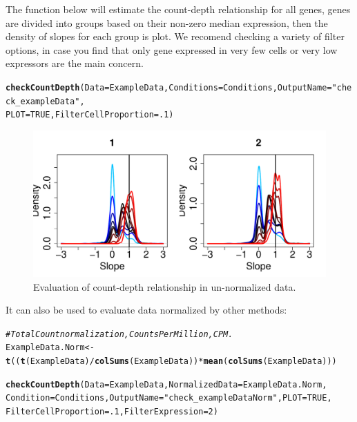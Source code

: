 \documentclass{article}\usepackage[]{graphicx}\usepackage[usenames,dvipsnames]{color}
\makeatletter
\newcommand{\hlnum}[1]{\textcolor[rgb]{0.686,0.059,0.569}{#1}}%
\newcommand{\hlstr}[1]{\textcolor[rgb]{0.192,0.494,0.8}{#1}}%
\newcommand{\hlcom}[1]{\textcolor[rgb]{0.678,0.584,0.686}{\textit{#1}}}%
\newcommand{\hlopt}[1]{\textcolor[rgb]{0,0,0}{#1}}%
\newcommand{\hlstd}[1]{\textcolor[rgb]{0.345,0.345,0.345}{#1}}%
\newcommand{\hlkwb}[1]{\textcolor[rgb]{0.69,0.353,0.396}{#1}}%
\newcommand{\hlkwc}[1]{\textcolor[rgb]{0.333,0.667,0.333}{#1}}%
\newcommand{\hlkwd}[1]{\textcolor[rgb]{0.737,0.353,0.396}{\textbf{#1}}}%
\newenvironment{kframe}{%
 \def\at@end@of@kframe{}%
 \ifinner\ifhmode%
  \def\at@end@of@kframe{\end{minipage}}%
  \begin{minipage}{\columnwidth}%
 \fi\fi%
 \def\FrameCommand##1{\hskip\@totalleftmargin \hskip-\fboxsep
 \colorbox{shadecolor}{##1}\hskip-\fboxsep
     \hskip-\linewidth \hskip-\@totalleftmargin \hskip\columnwidth}%
 \MakeFramed {\advance\hsize-\width
   \@totalleftmargin\z@ \linewidth\hsize
   \@setminipage}}%
 {\par\unskip\endMakeFramed%
 \at@end@of@kframe}
\newenvironment{knitrout}{}{} %
\makeatother
\begin{document}
The function below will estimate the count-depth relationship for all genes, genes are divided into groups based on their non-zero median expression, then the density of slopes for each group is plot. We recomend checking a variety of filter options, in case you find that only gene expressed in very few cells or very low expressors are the main concern.
\begin{knitrout}
\color{fgcolor}\begin{kframe}
\begin{alltt}
\hlkwd{checkCountDepth}\hlstd{(}\hlkwc{Data} \hlstd{= ExampleData,} \hlkwc{Conditions} \hlstd{= Conditions,} \hlkwc{OutputName} \hlstd{=} \hlstr{"check_exampleData"}\hlstd{,}
                \hlkwc{PLOT}\hlstd{=}\hlnum{TRUE}\hlstd{,} \hlkwc{FilterCellProportion} \hlstd{=} \hlnum{.1}\hlstd{)}
\end{alltt}
\end{kframe}
\end{knitrout}
  
\begin{figure}[h!]
\centering
\includegraphics[width=.7\textwidth]{check_exampleData_initial_evaluation.pdf}
\caption{Evaluation of count-depth relationship in un-normalized data.}
\end{figure}

\newpage
It can also be used to evaluate data normalized by other methods:
\begin{knitrout}
\color{fgcolor}\begin{kframe}
\begin{alltt}
\hlcom{# Total Count normalization, Counts Per Million, CPM. }
\hlstd{ExampleData.Norm} \hlkwb{<-} \hlkwd{t}\hlstd{((}\hlkwd{t}\hlstd{(ExampleData)} \hlopt{/} \hlkwd{colSums}\hlstd{(ExampleData))} \hlopt{*} \hlkwd{mean}\hlstd{(}\hlkwd{colSums}\hlstd{(ExampleData)))}

\hlkwd{checkCountDepth}\hlstd{(}\hlkwc{Data} \hlstd{= ExampleData,} \hlkwc{NormalizedData} \hlstd{= ExampleData.Norm,}
                \hlkwc{Condition} \hlstd{= Conditions,} \hlkwc{OutputName} \hlstd{=} \hlstr{"check_exampleDataNorm"}\hlstd{,} \hlkwc{PLOT}\hlstd{=}\hlnum{TRUE}\hlstd{,}
                \hlkwc{FilterCellProportion} \hlstd{=} \hlnum{.1}\hlstd{,} \hlkwc{FilterExpression} \hlstd{=} \hlnum{2}\hlstd{)}
\end{alltt}
\end{kframe}
\end{knitrout}
\end{document}
